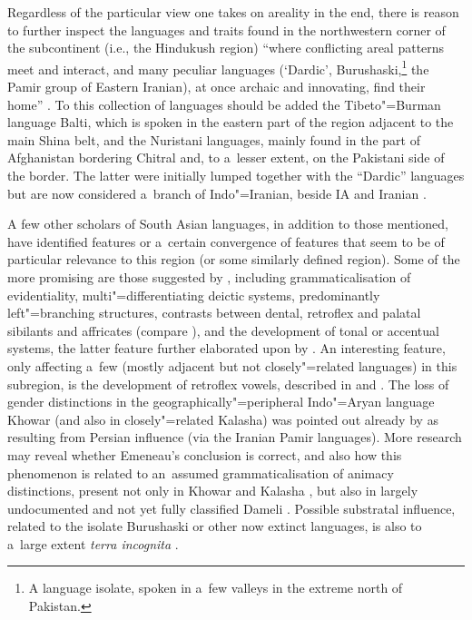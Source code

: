 Regardless of the particular view one takes on areality in the end, there is reason to further inspect the languages and traits found in the northwestern corner of the subcontinent (i.e., the Hindukush region) ``where conflicting areal patterns meet and interact, and many peculiar languages (`Dardic', Burushaski,\footnote{A language isolate, spoken in a~few valleys in the extreme north of Pakistan.} the Pamir group of Eastern Iranian), at once archaic and innovating, find their home'' \citep[225]{masica2001}. To this collection of languages should be added the Tibeto"=Burman language Balti, which is spoken in the eastern part of the region adjacent to the main Shina belt, and the Nuristani languages, mainly found in the part of Afghanistan bordering Chitral and, to a~lesser extent, on the Pakistani side of the border. The latter were initially lumped together with the ``Dardic'' languages but are now considered a~branch of Indo"=Iranian, beside IA and Iranian \citep{degener2002,strand2001}.


A few other scholars of South Asian languages, in addition to those mentioned, have identified features or a~certain convergence of features that seem to be of particular relevance to this region (or some similarly defined region). Some of the more promising are those suggested by \citet{bashir2003}, including grammaticalisation of evidentiality, multi"=differentiating deictic systems, predominantly left"=branching structures, contrasts between dental, retroflex and palatal sibilants and affricates (compare \citealt{tikkanen2008}), and the development of tonal or accentual systems, the latter feature further elaborated upon by \citet{baart2014}. An interesting feature, only affecting a~few (mostly adjacent but not closely"=related languages) in this subregion, is the development of retroflex vowels, described in \citet{morch1997} and \citet{heegardmorch2004}. The loss of gender distinctions in the geographically"=peripheral Indo"=Aryan language Khowar (and also in closely"=related Kalasha) was pointed out already by \citet{emeneau1965} as resulting from Persian influence (via the Iranian Pamir languages). More research may reveal whether Emeneau's conclusion is correct, and also how this phenomenon is related to an~assumed grammaticalisation of animacy distinctions, present not only in Khowar and Kalasha \citep[401]{bashir1988}, but also in largely undocumented and not yet fully classified Dameli \citep[4--6]{perder2013}. Possible substratal influence, related to the isolate Burushaski or other now extinct languages, is also to a~large extent \textit{terra incognita} \citep{tikkanen1988}.


